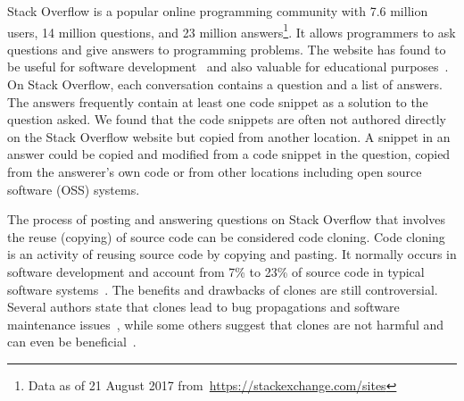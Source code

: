 \documentclass[10pt,journal,compsoc]{IEEEtran}
\begin{document}
%
\IEEEpeerreviewmaketitle


Stack Overflow is a popular online programming community with 7.6 million users,
14 million questions, and 23 million answers\footnote{Data as of 21 August 2017
	from~\url{https://stackexchange.com/sites}}. It allows programmers to ask
questions and give answers to programming problems. The website has found to be
useful for software
development~\cite{Ponzanelli2013,Ponzanelli2014,Keivanloo2014,Park2014,
	Stolee2014,Subramanian2013,Diamantopoulos2015,Treude2016} and also valuable for
educational purposes~\cite{Nasehi2012}. On Stack Overflow, each conversation
contains a question and a list of answers. The answers frequently contain at
least one code snippet as a solution to the question asked. We found that the
code snippets are often not authored directly on the Stack Overflow website
but copied from another location. A snippet in an answer could be copied and
modified from a code snippet in the question, copied from the answerer's own
code or from other locations including open source software (OSS) systems.

The process of posting and answering questions on Stack Overflow that involves
the reuse (copying) of source code can be considered code cloning. Code cloning
is an activity of reusing source code by copying and pasting. It normally occurs
in software development and account from 7\% to 23\% of source code in typical
software systems~\cite{Bellon2007}. The benefits and drawbacks of clones are
still controversial. Several authors state that clones lead to bug propagations
and software maintenance issues~\cite{Kamiya2002}, while some others suggest
that clones are not harmful and can even be
beneficial~\cite{Saini2016,Kapser2006}.
\end{document}
